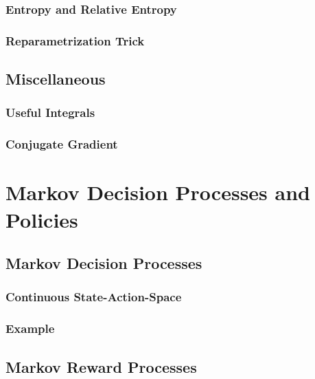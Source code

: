 		\subsection{Entropy and Relative Entropy} %

		\subsection{Reparametrization Trick} %

	\section{Miscellaneous} %

		\subsection{Useful Integrals} %

		\subsection{Conjugate Gradient} %

\chapter{Markov Decision Processes and Policies} %

	\section{Markov Decision Processes} %

		\subsection{Continuous State-Action-Space} %

		\subsection{Example} %

	\section{Markov Reward Processes} %

